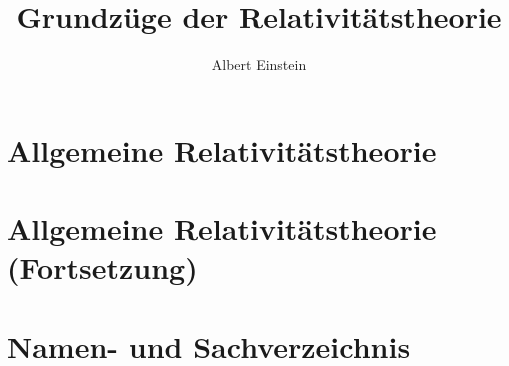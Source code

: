 \documentclass[11pt,oneside]{article} %
\author{Albert Einstein}
\title{Grundzüge der Relativitätstheorie}
\begin{document}
\setcounter{secnumdepth}{0}







\section{Allgemeine Relativitätstheorie}
\label{sec:all-1}

\section{Allgemeine Relativitätstheorie (Fortsetzung)}
\label{sec:all-2}

\appendix

\renewcommand{\thesection}{\Roman{section}}

\setcounter{secnumdepth}{1}





\setcounter{secnumdepth}{0}

\section{Namen- und Sachverzeichnis}
\label{sec:nam-1}

\printindex
\end{document}
